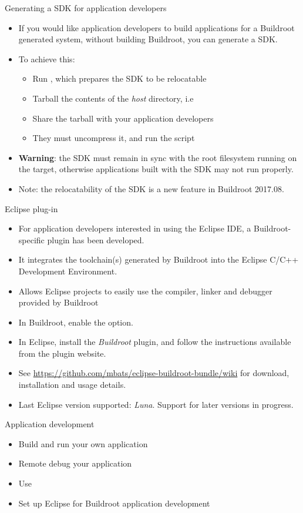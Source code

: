 \begin{frame}{Generating a SDK for application developers}
  \begin{itemize}
  \item If you would like application developers to build applications
    for a Buildroot generated system, without building Buildroot, you
    can generate a SDK.
  \item To achieve this:
    \begin{itemize}
    \item Run , which prepares the SDK to be
      relocatable
    \item Tarball the contents of the {\em host} directory, i.e
    \item Share the tarball with your application developers
    \item They must uncompress it, and run the 
      script
    \end{itemize}
  \item {\bf Warning}: the SDK must remain in sync with the root
    filesystem running on the target, otherwise applications built
    with the SDK may not run properly.
  \item Note: the relocatability of the SDK is a new feature in
    Buildroot 2017.08.
  \end{itemize}
\end{frame}

\begin{frame}{Eclipse plug-in}
  \begin{itemize}
  \item For application developers interested in using the Eclipse
    IDE, a Buildroot-specific plugin has been developed.
  \item It integrates the toolchain(s) generated by Buildroot into the
    Eclipse C/C++ Development Environment.
  \item Allows Eclipse projects to easily use the compiler, linker and
    debugger provided by Buildroot
  \item In Buildroot, enable the  option.
  \item In Eclipse, install the {\em Buildroot} plugin, and follow the
    instructions available from the plugin website.
  \item See
    \url{https://github.com/mbats/eclipse-buildroot-bundle/wiki} for
    download, installation and usage details.
  \item Last Eclipse version supported: {\em Luna}. Support for later
    versions in progress.
  \end{itemize}
\end{frame}

\setuplabframe
{Application development}
{
  \begin{itemize}
  \item Build and run your own application
  \item Remote debug your application
  \item Use 
  \item Set up Eclipse for Buildroot application development
  \end{itemize}
}
